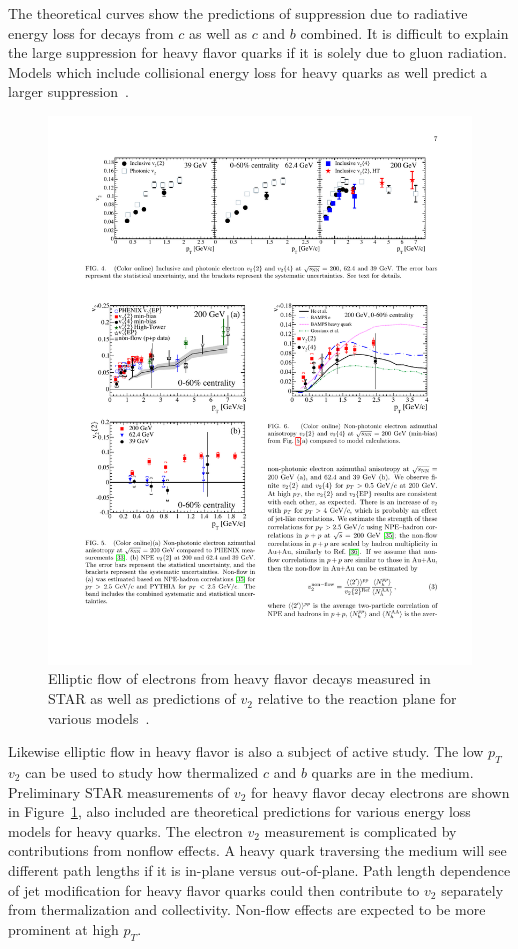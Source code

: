 The theoretical curves show the predictions of suppression due to radiative energy loss for decays from $c$ as well as $c$ and $b$ combined. It is difficult to explain the large suppression for heavy flavor quarks if it is solely due to gluon radiation. Models which include collisional energy loss for heavy quarks as well predict a larger suppression~\cite{dfqm2014}.

\begin{figure}[htbp]
\begin{center}
\includegraphics[scale=1.5]{Plots/Intro/npe_v2.pdf}
\end{center}
\caption[NPE $v_2$]{Elliptic flow of electrons from heavy flavor decays measured in STAR as well as predictions of $v_2$ relative to the reaction plane for various models~\cite{musNPEv2}.}
\label{fig:npe_v2_intro}
\end{figure}

Likewise elliptic flow in heavy flavor is also a subject of active study. The low $p_T$ $v_2$ can be used to study how thermalized $c$ and $b$ quarks are in the medium. Preliminary STAR measurements of $v_2$ for heavy flavor decay electrons are shown in Figure~\ref{fig:npe_v2_intro}, also included are theoretical predictions for various energy loss models for heavy quarks. The electron $v_2$ measurement is complicated by contributions from nonflow effects. A heavy quark traversing the medium will see different path lengths if it is in-plane versus out-of-plane. Path length dependence of jet modification for heavy flavor quarks could then contribute to $v_2$ separately from thermalization and collectivity. Non-flow effects are expected to be more prominent at high $p_T$.

